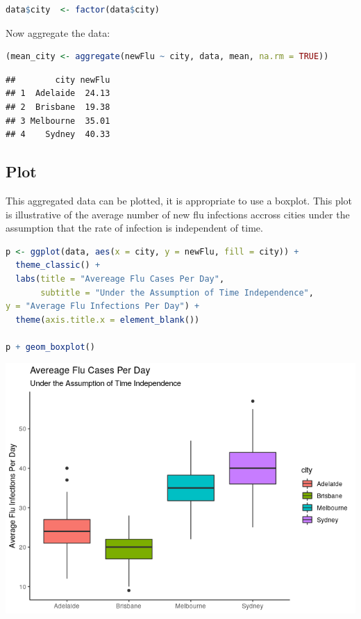 \documentclass{article}
\begin{document}
\begin{lstlisting}[language=R]
data$city  <- factor(data$city)
\end{lstlisting}

Now aggregate the data:

\begin{lstlisting}[language=R]
(mean_city <- aggregate(newFlu ~ city, data, mean, na.rm = TRUE)) 
\end{lstlisting}

\begin{lstlisting}
##        city newFlu
## 1  Adelaide  24.13
## 2  Brisbane  19.38
## 3 Melbourne  35.01
## 4    Sydney  40.33
\end{lstlisting}

\hypertarget{plot}{%
\subsection{Plot}\label{plot}}

This aggregated data can be plotted, it is appropriate to use a boxplot.
This plot is illustrative of the average number of new flu infections
accross cities under the assumption that the rate of infection is
independent of time.

\begin{lstlisting}[language=R]
p <- ggplot(data, aes(x = city, y = newFlu, fill = city)) +
  theme_classic() +
  labs(title = "Avereage Flu Cases Per Day",
       subtitle = "Under the Assumption of Time Independence",
y = "Average Flu Infections Per Day") +
  theme(axis.title.x = element_blank())

p + geom_boxplot()
\end{lstlisting}

\includegraphics{main_files/figure-html/unnamed-chunk-5-1.png}
\end{document}
